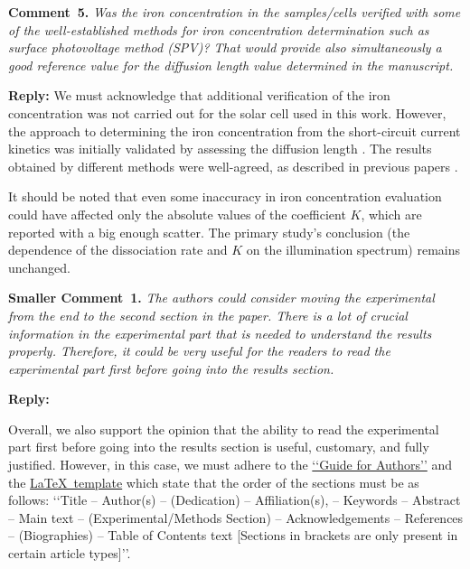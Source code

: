 \documentclass{WileyMSP-template}
\begin{document}
\vspace{1cm}
\noindent
\textcolor[rgb]{0.00,0.50,1.00}{\textbf{Comment~5.}}
\emph{
Was the iron concentration in the samples/cells verified with some of the well-established methods
for iron concentration determination such as surface photovoltage method (SPV)?
That would provide also simultaneously a good reference value for the diffusion length value determined in the manuscript.
}

\noindent
\textcolor[rgb]{0.51,0.00,0.00}{\textbf{Reply:}}
We must acknowledge that additional verification of the iron concentration was not carried out for the solar cell used in this work.
However, the approach to determining the iron concentration from the short-circuit current kinetics
was initially validated by assessing the diffusion length \cite{FeB_Zong}.
The results obtained by different methods were well-agreed, as described in previous papers \cite{Olikh2021JAP,Olikh2022:JMatSci}.

It should be noted that even some inaccuracy in iron concentration evaluation could have affected only
the absolute values of the coefficient $K$, which are reported \cite{FeBLight2,FeBAssJAP2014,FeBKin2019} with a big enough scatter.
The primary study's conclusion (the dependence of the dissociation rate and $K$ on the illumination spectrum) remains unchanged.




\vspace{1cm}
\noindent
\textcolor[rgb]{0.00,0.50,1.00}{\textbf{Smaller Comment~1.}}
\emph{The authors could consider moving the experimental from the end to the second section in the paper.
There is a lot of crucial information in the experimental part that is needed to understand the results properly.
Therefore, it could be very useful for the readers to read the experimental part first before going into the results section.}

\noindent
\textcolor[rgb]{0.51,0.00,0.00}{\textbf{Reply:}}

Overall, we also support the opinion that the ability to read the experimental part first
before going into the results section is useful, customary, and fully justified.
However, in this case, we must adhere to the
\href{https://onlinelibrary.wiley.com/page/journal/18626319/homepage/author-guidelines}{‘‘Guide for Authors’’}
and the
\href{https://onlinelibrary.wiley.com/pb-assets/assets/vch/msp/LaTeX-template-1593698612150.zip}{\LaTeX~template}
which state that the order of the sections must be as follows:
‘‘Title -- Author(s) -- (Dedication) -- Affiliation(s), -- Keywords --
Abstract -- Main text -- (Experimental/Methods Section) -- Acknowledgements -- References -- (Biographies) -- Table of Contents text
 [Sections in brackets are only present in certain article types]’’.
\end{document}
